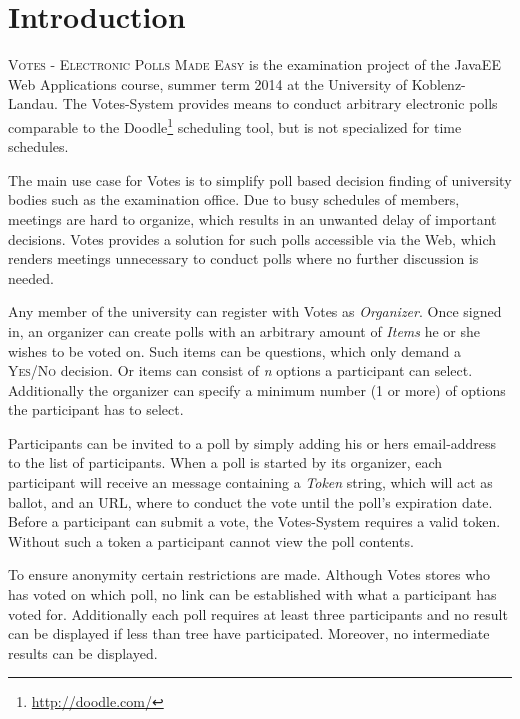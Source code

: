 \section{Introduction}
\textsc{Votes - Electronic Polls Made Easy} is the examination project of the JavaEE Web Applications course, summer term 2014 at the University of Koblenz-Landau.
The Votes-System provides means to conduct arbitrary electronic polls comparable to the Doodle\footnote{\url{http://doodle.com/}} scheduling tool, but is not specialized for time schedules.

The main use case for Votes is to simplify poll based decision finding of university bodies such as the examination office.
Due to busy schedules of members, meetings are hard to organize, which results in an unwanted delay of important decisions.
Votes provides a solution for such polls accessible via the Web, which renders meetings unnecessary to conduct polls where no further discussion is needed.

Any member of the university can register with Votes as \textit{Organizer}.
Once signed in, an organizer can create polls with an arbitrary amount of \textit{Items} he or she wishes to be voted on.
Such items can be questions, which only demand a \textsc{Yes/No} decision.
Or items can consist of \textit{n} options a participant can select.
Additionally the organizer can specify a minimum number (1 or more) of options the participant has to select.

Participants can be invited to a poll by simply adding his or hers email-address to the list of participants.
When a poll is started by its organizer, each participant will receive an message containing a \textit{Token} string, which will act as ballot, and an URL, where to conduct the vote until the poll's expiration date.
Before a participant can submit a vote, the Votes-System requires a valid token.
Without such a token a participant cannot view the poll contents.

To ensure anonymity certain restrictions are made.
Although Votes stores who has voted on which poll, no link can be established with what a participant has voted for.
Additionally each poll requires at least three participants and no result can be displayed if less than tree have participated.
Moreover, no intermediate results can be displayed.
